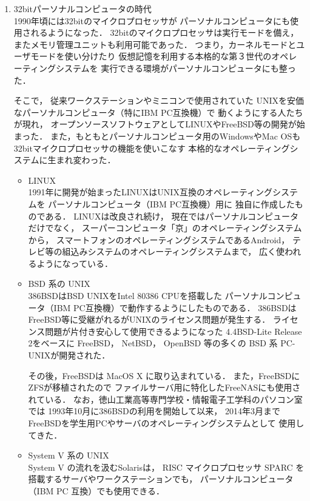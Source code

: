 \begin{enumerate}
\item 32bitパーソナルコンピュータの時代 \\
1990年頃には32bitのマイクロプロセッサが
パーソナルコンピュータにも使用されるようになった．
32bitのマイクロプロセッサは実行モードを備え，
またメモリ管理ユニットも利用可能であった．
つまり，カーネルモードとユーザモードを使い分けたり
仮想記憶を利用する本格的な第３世代のオペレーティングシステムを
実行できる環境がパーソナルコンピュータにも整った．

そこで，
従来ワークステーションやミニコンで使用されていた
UNIXを安価なパーソナルコンピュータ（特にIBM PC互換機）で
動くようにする人たちが現れ，
オープンソースソフトウェアとしてLINUXやFreeBSD等の開発が始まった．
また，もともとパーソナルコンピュータ用のWindowsやMac OSも
32bitマイクロプロセッサの機能を使いこなす
本格的なオペレーティングシステムに生まれ変わった．

\begin{itemize}
\item LINUX \\
1991年に開発が始まったLINUXはUNIX互換のオペレーティングシステムを
パーソナルコンピュータ（IBM PC互換機）用に
独自に作成したものである\cite{linux}．
LINUXは改良され続け，
現在ではパーソナルコンピュータだけでなく，
スーパーコンピュータ「京」のオペレーティングシステム\cite{kei}から，
スマートフォンのオペレーティングシステムであるAndroid\cite{android}，
テレビ等の組込みシステムのオペレーティングシステムまで，
広く使われるようになっている．

\item BSD 系の UNIX \\
386BSD\cite{386bsd}はBSD UNIXをIntel 80386 CPUを搭載した
パーソナルコンピュータ（IBM PC互換機）で動作するようにしたものである．
386BSDはFreeBSD等に受継がれるがUNIXのライセンス問題が発生する\cite{unix}．
ライセンス問題が片付き安心して使用できるようになった
4.4BSD-Lite Release 2\cite{unix}をベースに
FreeBSD， NetBSD， OpenBSD 等の多くの BSD 系 PC-UNIXが開発された．

その後，FreeBSDは MacOS X に取り込まれている．
また，FreeBSDにZFSが移植された\cite{zfs}ので
ファイルサーバ用に特化したFreeNAS\cite{freenas}にも使用されている．
なお，徳山工業高等専門学校・情報電子工学科のパソコン室では
1993年10月に386BSDの利用を開始して以来，
2014年3月までFreeBSDを学生用PCやサーバのオペレーティングシステムとして
使用してきた\cite{iebsd}．

\item System V 系の UNIX \\
System V の流れを汲むSolaris\cite{solaris}は，
RISC マイクロプロセッサ SPARC を搭載するサーバやワークステーションでも，
パーソナルコンピュータ（IBM PC 互換）でも使用できる．


\end{itemize}
\end{enumerate}
